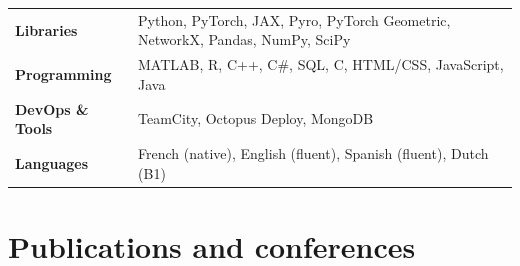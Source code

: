 \documentclass[a4paper,10pt]{article} %
\begin{document}
\begin{tabular}{p{2.8cm}p{13.5cm}}
\textbf{Libraries} & Python, PyTorch, JAX, Pyro, PyTorch Geometric, NetworkX, Pandas, NumPy, SciPy \\
\textbf{Programming} & MATLAB, R, C++, C\#, SQL, C, HTML/CSS, JavaScript, Java \\
\textbf{DevOps \& Tools} & TeamCity, Octopus Deploy, MongoDB \\
\textbf{Languages}  & French (native), English (fluent), Spanish (fluent), Dutch (B1) \\
\end{tabular}
\clearpage

\section{Publications and conferences}
\end{document}
